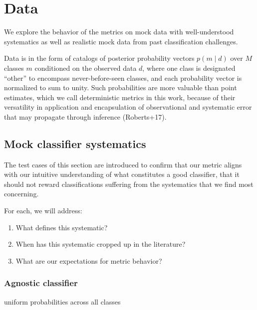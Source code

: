\section{Data}
\label{sec:data}

We explore the behavior of the metrics on mock data with well-understood systematics as well as realistic mock data from past classification challenges.

Data is in the form of catalogs of posterior probability vectors $p(m \mid d)$ over $M$ classes $m$ conditioned on the observed data $d$, where one class is designated ``other'' to encompass never-before-seen classes, and each probability vector is normalized to sum to unity.
Such probabilities are more valuable than point estimates, which we call deterministic metrics in this work, because of their versatility in application and encapsulation of observational and systematic error that may propagate through inference (Roberts+17).

\subsection{Mock classifier systematics}
\label{sec:mockdata}

The test cases of this section are introduced to confirm that our metric aligns with our intuitive understanding of what constitutes a good classifier, that it should not reward classifications suffering from the systematics that we find most concerning.

For each, we will address:
\begin{enumerate}
  \item What defines this systematic?
  \item When has this systematic cropped up in the literature?
  \item What are our expectations for metric behavior?
\end{enumerate}


\subsubsection{Agnostic classifier}
\label{sec:agnostic_data}

uniform probabilities across all classes

